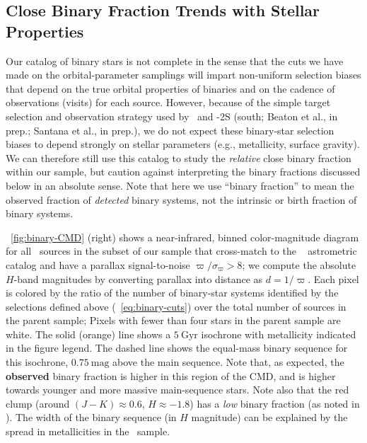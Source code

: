 \documentclass[modern]{aastex63}
\newcommand{\changes}[1]{{\bf\color{purple}#1}}
\begin{document}
\subsection{Close Binary Fraction Trends with Stellar Properties}
\label{sec:binary-fraction}

Our catalog of binary stars is not complete in the sense that the cuts we have
made on the orbital-parameter samplings will impart non-uniform selection biases
that depend on the true orbital properties of binaries and on the cadence of
observations (visits) for each source.
However, because of the simple target selection and observation strategy used by
\apogee\, \citep{Zasowski:2013, Zasowski:2017} and \apogee-2S (south; Beaton et
al., in prep.; Santana et al., in prep.), we do not expect these binary-star
selection biases to depend strongly on stellar parameters (e.g., metallicity,
surface gravity).
We can therefore still use this catalog to study the \emph{relative} close
binary fraction within our sample, but caution against interpreting the binary
fractions discussed below in an absolute sense.
Note that here we use ``binary fraction'' to mean the observed fraction of
\emph{detected} binary systems, not the intrinsic or birth fraction of binary
systems.

\figurename~\ref{fig:binary-CMD} (right) shows a near-infrared, binned
color-magnitude diagram for all \apogee\ sources in the subset of our sample
that cross-match to the \gaia\  astrometric catalog
\citep{Gaia-Collaboration:2016, Gaia-Collaboration:2018, Gaia:2018a} and have a
parallax signal-to-noise $\varpi / \sigma_\varpi > 8$; we compute the absolute
$H$-band magnitudes by converting parallax into distance as $d = 1/\varpi$.
Each pixel is colored by the ratio of the number of binary-star systems
identified by the selections defined above (\equationname~\ref{eq:binary-cuts})
over the total number of sources in the parent sample; Pixels with fewer than
four stars in the parent sample are white.
The solid (orange) line shows a $5~\mathrm{Gyr}$  isochrone
\cite{Dotter:2016, Choi:2016, Paxton:2011, Paxton:2013, Paxton:2015} with
metallicity indicated in the figure legend.
The dashed line shows the equal-mass binary sequence for this isochrone,
$0.75~\mathrm{mag}$ above the main sequence.
Note that, as expected, the \changes{observed} binary fraction is higher in this region of the CMD,
and is higher towards younger and more massive main-sequence stars.
Note also that the red clump (around $(J-K) \approx 0.6$, $H \approx -1.8$) has
a \emph{low} binary fraction (as noted in \citealt{Badenes:2018}).
The width of the binary sequence (in $H$ magnitude) can be explained by the
spread in metallicities in the \apogee\ sample.
\end{document}
